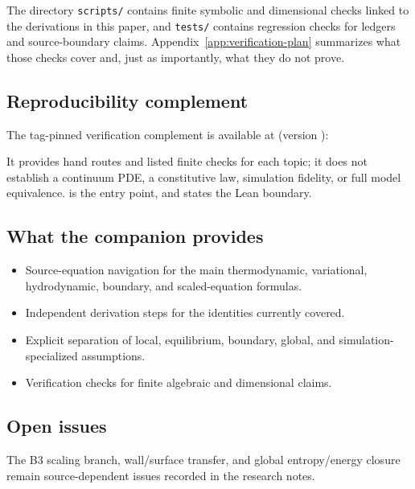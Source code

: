 The directory \texttt{scripts/} contains finite symbolic and dimensional
checks linked to the derivations in this paper, and \texttt{tests/} contains
regression checks for ledgers and source-boundary claims.
Appendix~\ref{app:verification-plan} summarizes what those checks cover and,
just as importantly, what they do not prove.

\subsection*{Reproducibility complement}

The tag-pinned verification complement is available at (version
\OnukiVerificationTag):
\begin{center}
\small \OnukiVerificationRepository
\end{center}
It provides hand routes and listed finite checks for each topic; it does not
establish a continuum PDE, a constitutive law, simulation fidelity, or full
model equivalence.  is the
entry point, and  states the
Lean boundary.

\subsection*{What the companion provides}

\begin{itemize}
\item Source-equation navigation for the main thermodynamic, variational,
  hydrodynamic, boundary, and scaled-equation formulas.
\item Independent derivation steps for the identities currently covered.
\item Explicit separation of local, equilibrium, boundary, global, and
  simulation-specialized assumptions.
\item Verification checks for finite algebraic and dimensional claims.
\end{itemize}

\subsection*{Open issues}

The B3 scaling branch, wall/surface transfer, and global entropy/energy closure
remain source-dependent issues recorded in the research notes.
